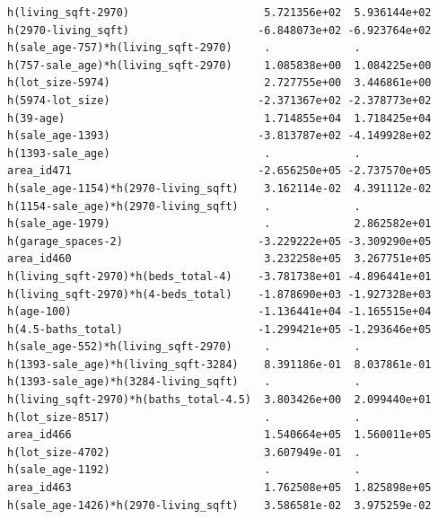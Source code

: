 \documentclass[
]{article}
\begin{document}
\begin{verbatim}
h(living_sqft-2970)                     5.721356e+02  5.936144e+02
h(2970-living_sqft)                    -6.848073e+02 -6.923764e+02
h(sale_age-757)*h(living_sqft-2970)     .             .           
h(757-sale_age)*h(living_sqft-2970)     1.085838e+00  1.084225e+00
h(lot_size-5974)                        2.727755e+00  3.446861e+00
h(5974-lot_size)                       -2.371367e+02 -2.378773e+02
h(39-age)                               1.714855e+04  1.718425e+04
h(sale_age-1393)                       -3.813787e+02 -4.149928e+02
h(1393-sale_age)                        .             .           
area_id471                             -2.656250e+05 -2.737570e+05
h(sale_age-1154)*h(2970-living_sqft)    3.162114e-02  4.391112e-02
h(1154-sale_age)*h(2970-living_sqft)    .             .           
h(sale_age-1979)                        .             2.862582e+01
h(garage_spaces-2)                     -3.229222e+05 -3.309290e+05
area_id460                              3.232258e+05  3.267751e+05
h(living_sqft-2970)*h(beds_total-4)    -3.781738e+01 -4.896441e+01
h(living_sqft-2970)*h(4-beds_total)    -1.878690e+03 -1.927328e+03
h(age-100)                             -1.136441e+04 -1.165515e+04
h(4.5-baths_total)                     -1.299421e+05 -1.293646e+05
h(sale_age-552)*h(living_sqft-2970)     .             .           
h(1393-sale_age)*h(living_sqft-3284)    8.391186e-01  8.037861e-01
h(1393-sale_age)*h(3284-living_sqft)    .             .           
h(living_sqft-2970)*h(baths_total-4.5)  3.803426e+00  2.099440e+01
h(lot_size-8517)                        .             .           
area_id466                              1.540664e+05  1.560011e+05
h(lot_size-4702)                        3.607949e-01  .           
h(sale_age-1192)                        .             .           
area_id463                              1.762508e+05  1.825898e+05
h(sale_age-1426)*h(2970-living_sqft)    3.586581e-02  3.975259e-02
                                                                  

\end{verbatim}
\end{document}
